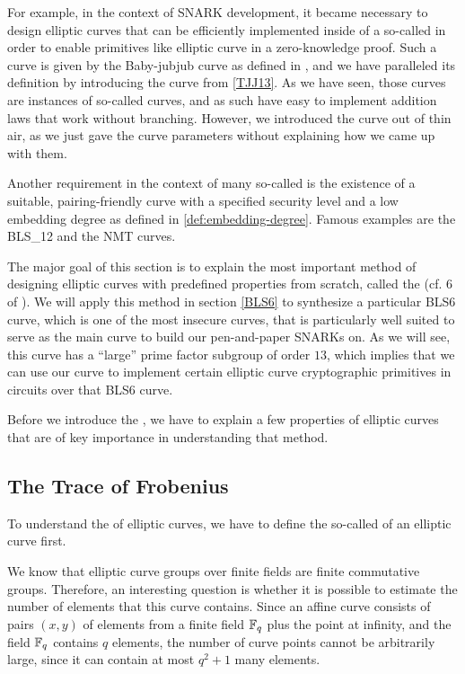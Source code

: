 For example, in the context of SNARK development, it became necessary to design elliptic curves that can be efficiently implemented inside of a so-called  in order to enable primitives like elliptic curve  in a zero-knowledge proof. Such a curve is given by the Baby-jubjub curve as defined in \cite{whitehat-21}, and we have paralleled its definition by introducing the  curve from \examplename{} \ref{TJJ13}. As we have seen, those curves are instances of so-called  curves, and as such have easy to implement addition laws that work without branching. However, we introduced the  curve out of thin air, as we just gave the curve parameters without explaining how we came up with them.

Another requirement in the context of many so-called  is the existence of a suitable, pairing-friendly curve with a specified security level and a low embedding degree as defined in \ref{def:embedding-degree}. Famous examples are the BLS\_12 and the NMT curves.

The major goal of this section is to explain the most important method of designing elliptic curves with predefined properties from scratch, called the  (cf. \chaptname{} 6 of \cite{silverman-1994}). We will apply this method in section \ref{BLS6} to synthesize a particular BLS6 curve, which is one of the most insecure curves, that is particularly well suited to serve  as the main curve to build our pen-and-paper SNARKs on. As we will see, this curve has a ``large'' prime factor subgroup of order $13$, which implies that we can use our  curve to implement certain elliptic curve cryptographic primitives in circuits over that BLS6 curve. 
 
Before we introduce the , we have to explain a few properties of elliptic curves that are of key importance in understanding that method. 

\subsection{The Trace of Frobenius} To understand the  of elliptic curves, we have to define the so-called  of an elliptic curve first.

We know that elliptic curve groups over finite fields are finite commutative groups. Therefore, an interesting question is whether it is possible to estimate the number of elements that this curve contains. Since an affine  curve consists of pairs $(x,y)$ of elements from a finite field $\mathbb{F}_q$ plus the point at infinity, and the field $\mathbb{F}_q$ contains $q$ elements, the number of curve points cannot be arbitrarily large, since it can contain at most $q^2+1$ many elements. 

